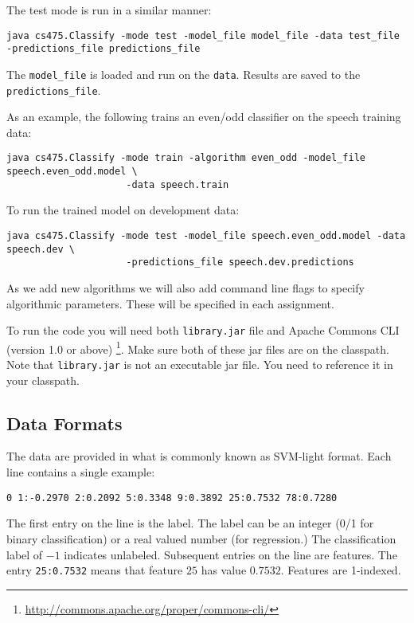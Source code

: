 \documentclass[11pt]{article}
\begin{document}
The test mode is run in a similar manner:
\begin{footnotesize}
\begin{verbatim}
java cs475.Classify -mode test -model_file model_file -data test_file -predictions_file predictions_file
\end{verbatim}
\end{footnotesize}
The {\tt model\_file} is loaded and run on the {\tt data}. Results are saved to the {\tt predictions\_file}.

As an example, the following trains an even/odd classifier on the speech training data:
\begin{footnotesize}
\begin{verbatim}
java cs475.Classify -mode train -algorithm even_odd -model_file speech.even_odd.model \
                     -data speech.train
\end{verbatim}
\end{footnotesize}
To run the trained model on development data:
\begin{footnotesize}
\begin{verbatim}
java cs475.Classify -mode test -model_file speech.even_odd.model -data speech.dev \
                     -predictions_file speech.dev.predictions
\end{verbatim}
\end{footnotesize}

As we add new algorithms we will also add command line flags to specify algorithmic parameters. These will be specified in each assignment.

To run the code you will need both {\tt library.jar} file and Apache Commons CLI (version 1.0 or above) \footnote{\href{http://commons.apache.org/proper/commons-cli/}{http://commons.apache.org/proper/commons-cli/}}. Make sure both of these jar files are on the classpath. Note that {\tt library.jar} is not an executable jar file. You need to reference it in your classpath.



\subsection{Data Formats}
The data are provided in what is commonly known as SVM-light format. Each line contains a single example:
\begin{footnotesize}
\begin{verbatim}
0 1:-0.2970 2:0.2092 5:0.3348 9:0.3892 25:0.7532 78:0.7280
\end{verbatim}
\end{footnotesize}
The first entry on the line is the label. The label can be an integer (0/1 for binary classification) or a real valued number (for regression.) The classification label of $-1$ indicates unlabeled. Subsequent entries on the line are features. The entry {\tt 25:0.7532} means that feature $25$ has value $0.7532$. Features are 1-indexed.
\end{document}
